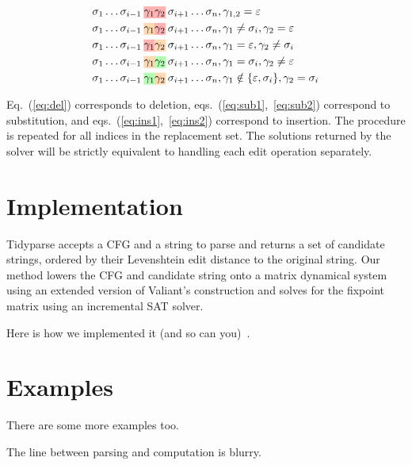 \documentclass[sigplan,nonacm]{acmart}\settopmatter{printfolios=false,printccs=false,printacmref=false}
\begin{document}
\begin{align}
&\sigma_{1}\ldots\sigma_{i-1}\:\text{\hlred{$\gamma_1$}\hlred{$\gamma_2$}}\:\sigma_{i+1}\ldots\sigma_{n}, \gamma_{1, 2} = \varepsilon\label{eq:del}\\
&\sigma_{1}\ldots \sigma_{i-1}\:\text{\hlorange{$\gamma_1$}\hlred{$\gamma_2$}}\:\sigma_{i+1}\ldots \sigma_{n}, \gamma_1 \neq \sigma_i, \gamma_2 = \varepsilon\label{eq:sub1}\\
&\sigma_{1}\ldots \sigma_{i-1}\:\text{\hlred{$\gamma_1$}\hlorange{$\gamma_2$}}\:\sigma_{i+1}\ldots \sigma_{n}, \gamma_1 = \varepsilon, \gamma_2 \neq \sigma_i\label{eq:sub2}\\
&\sigma_{1}\ldots\sigma_{i-1}\: \text{\hlorange{$\gamma_1$}\hlgreen{$\gamma_2$}}\:\sigma_{i+1}\ldots\sigma_{n}, \gamma_1 = \sigma_i, \gamma_2 \neq \varepsilon\label{eq:ins1}\\
&\sigma_{1}\ldots\sigma_{i-1}\: \text{\hlgreen{$\gamma_1$}\hlorange{$\gamma_2$}}\:\sigma_{i+1}\ldots\sigma_{n}, \gamma_1 \notin \{\varepsilon, \sigma_i\}, \gamma_2 = \sigma_i\label{eq:ins2}
\end{align}

Eq.~(\ref{eq:del}) corresponds to deletion, eqs.~(\ref{eq:sub1},~\ref{eq:sub2}) correspond to substitution, and eqs.~(\ref{eq:ins1},~\ref{eq:ins2}) correspond to insertion. The procedure is repeated for all indices in the replacement set. The solutions returned by the solver will be strictly equivalent to handling each edit operation separately.

\pagebreak
\section{Implementation}

Tidyparse accepts a CFG and a string to parse and returns a set of candidate strings, ordered by their Levenshtein edit distance to the original string. Our method lowers the CFG and candidate string onto a matrix dynamical system using an extended version of Valiant's construction and solves for the fixpoint matrix using an incremental SAT solver.

    Here is how we implemented it (and so can you)~\cite{valiant1975general}.
\section{Examples}
There are some more examples too.

The line between parsing and computation is blurry.
\end{document}
